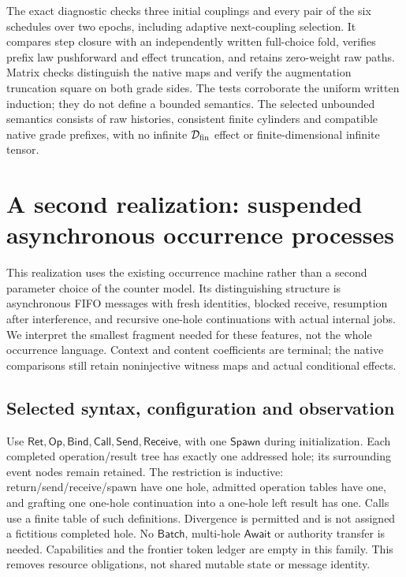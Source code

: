 \documentclass[11pt]{article}
\begin{document}
The exact diagnostic checks three initial couplings and every pair of the six schedules over two epochs, including adaptive next-coupling selection. It compares step closure with an independently written full-choice fold, verifies prefix law pushforward and effect truncation, and retains zero-weight raw paths. Matrix checks distinguish the native maps and verify the augmentation truncation square on both grade sides. The tests corroborate the uniform written induction; they do not define a bounded semantics. The selected unbounded semantics consists of raw histories, consistent finite cylinders and compatible native grade prefixes, with no infinite $\mathcal D_{\rm fin}$ effect or finite-dimensional infinite tensor.

\section{A second realization: suspended asynchronous occurrence processes}\label{sec:occurrence-realization}

This realization uses the existing occurrence machine rather than a second parameter choice of the counter model. Its distinguishing structure is asynchronous FIFO messages with fresh identities, blocked receive, resumption after interference, and recursive one-hole continuations with actual internal jobs. We interpret the smallest fragment needed for these features, not the whole occurrence language. Context and content coefficients are terminal; the native comparisons still retain noninjective witness maps and actual conditional effects.

\subsection{Selected syntax, configuration and observation}

Use $\mathsf{Ret},\mathsf{Op},\mathsf{Bind},\mathsf{Call},\mathsf{Send},\mathsf{Receive}$, with one $\mathsf{Spawn}$ during initialization. Each completed operation/result tree has exactly one addressed hole; its surrounding event nodes remain retained. The restriction is inductive: return/send/receive/spawn have one hole, admitted operation tables have one, and grafting one one-hole continuation into a one-hole left result has one. Calls use a finite table of such definitions. Divergence is permitted and is not assigned a fictitious completed hole. No $\mathsf{Batch}$, multi-hole $\mathsf{Await}$ or authority transfer is needed. Capabilities and the frontier token ledger are empty in this family. This removes resource obligations, not shared mutable state or message identity.
\end{document}
